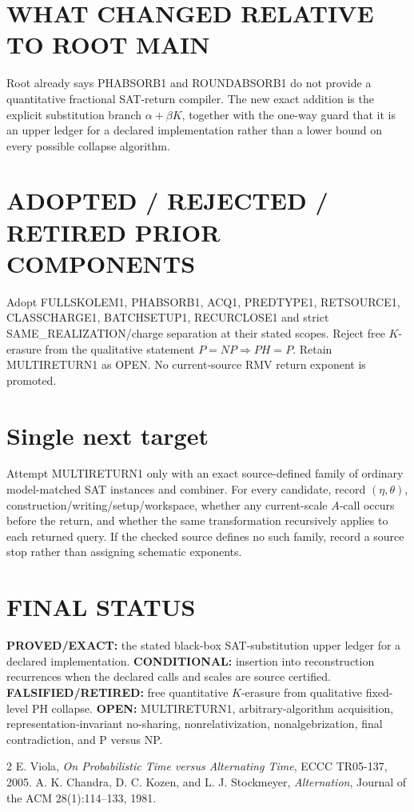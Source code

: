 \documentclass[11pt]{article}
\begin{document}
\section*{WHAT CHANGED RELATIVE TO ROOT MAIN}
Root already says PHABSORB1 and ROUNDABSORB1 do not provide a quantitative fractional SAT-return compiler. The new exact addition is the explicit substitution branch \(\alpha+\beta K\), together with the one-way guard that it is an upper ledger for a declared implementation rather than a lower bound on every possible collapse algorithm.

\section*{ADOPTED / REJECTED / RETIRED PRIOR COMPONENTS}
Adopt FULLSKOLEM1, PHABSORB1, ACQ1, PREDTYPE1, RETSOURCE1, CLASSCHARGE1, BATCHSETUP1, RECURCLOSE1 and strict SAME_REALIZATION/charge separation at their stated scopes. Reject free \(K\)-erasure from the qualitative statement \(P=NP\Rightarrow PH=P\). Retain MULTIRETURN1 as OPEN. No current-source RMV return exponent is promoted.

\section*{Single next target}
Attempt MULTIRETURN1 only with an exact source-defined family of ordinary model-matched SAT instances and combiner. For every candidate, record \((\eta,\theta)\), construction/writing/setup/workspace, whether any current-scale \(A\)-call occurs before the return, and whether the same transformation recursively applies to each returned query. If the checked source defines no such family, record a source stop rather than assigning schematic exponents.

\section*{FINAL STATUS}
\textbf{PROVED/EXACT:} the stated black-box SAT-substitution upper ledger for a declared implementation. \textbf{CONDITIONAL:} insertion into reconstruction recurrences when the declared calls and scales are source certified. \textbf{FALSIFIED/RETIRED:} free quantitative \(K\)-erasure from qualitative fixed-level PH collapse. \textbf{OPEN:} MULTIRETURN1, arbitrary-algorithm acquisition, representation-invariant no-sharing, nonrelativization, nonalgebrization, final contradiction, and P versus NP.

\begin{thebibliography}{2}
 E. Viola, \emph{On Probabilistic Time versus Alternating Time}, ECCC TR05-137, 2005.
 A. K. Chandra, D. C. Kozen, and L. J. Stockmeyer, \emph{Alternation}, Journal of the ACM 28(1):114--133, 1981.
\end{thebibliography}
\end{document}
